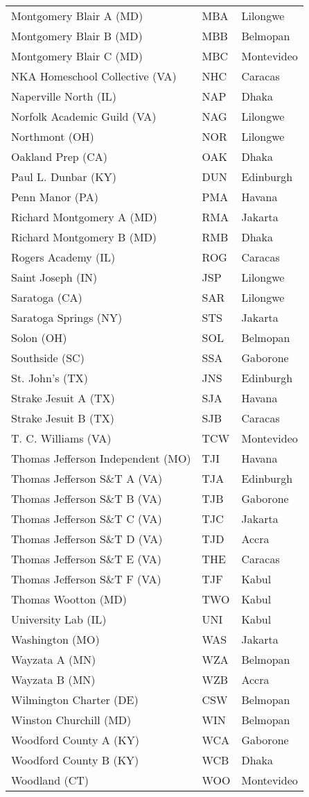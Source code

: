 \documentclass{article}%
\begin{document}
\begin{longtable}{|ll|l|}
Montgomery Blair A (MD)&MBA&Lilongwe\\%
Montgomery Blair B (MD)&MBB&Belmopan\\%
Montgomery Blair C (MD)&MBC&Montevideo\\%
NKA Homeschool Collective (VA)&NHC&Caracas\\%
Naperville North (IL)&NAP&Dhaka\\%
Norfolk Academic Guild (VA)&NAG&Lilongwe\\%
Northmont (OH)&NOR&Lilongwe\\%
Oakland Prep (CA)&OAK&Dhaka\\%
Paul L. Dunbar (KY)&DUN&Edinburgh\\%
Penn Manor (PA)&PMA&Havana\\%
Richard Montgomery A (MD)&RMA&Jakarta\\%
Richard Montgomery B (MD)&RMB&Dhaka\\%
Rogers Academy (IL)&ROG&Caracas\\%
Saint Joseph (IN)&JSP&Lilongwe\\%
Saratoga (CA)&SAR&Lilongwe\\%
Saratoga Springs (NY)&STS&Jakarta\\%
Solon (OH)&SOL&Belmopan\\%
Southside (SC)&SSA&Gaborone\\%
St. John's (TX)&JNS&Edinburgh\\%
Strake Jesuit A (TX)&SJA&Havana\\%
Strake Jesuit B (TX)&SJB&Caracas\\%
T. C. Williams (VA)&TCW&Montevideo\\%
Thomas Jefferson Independent (MO)&TJI&Havana\\%
Thomas Jefferson S\&T A (VA)&TJA&Edinburgh\\%
Thomas Jefferson S\&T B (VA)&TJB&Gaborone\\%
Thomas Jefferson S\&T C (VA)&TJC&Jakarta\\%
Thomas Jefferson S\&T D (VA)&TJD&Accra\\%
Thomas Jefferson S\&T E (VA)&THE&Caracas\\%
Thomas Jefferson S\&T F (VA)&TJF&Kabul\\%
Thomas Wootton (MD)&TWO&Kabul\\%
University Lab (IL)&UNI&Kabul\\%
Washington (MO)&WAS&Jakarta\\%
Wayzata A (MN)&WZA&Belmopan\\%
Wayzata B (MN)&WZB&Accra\\%
Wilmington Charter (DE)&CSW&Belmopan\\%
Winston Churchill (MD)&WIN&Belmopan\\%
Woodford County A (KY)&WCA&Gaborone\\%
Woodford County B (KY)&WCB&Dhaka\\%
Woodland (CT)&WOO&Montevideo\\%
\end{longtable}%
\end{document}
